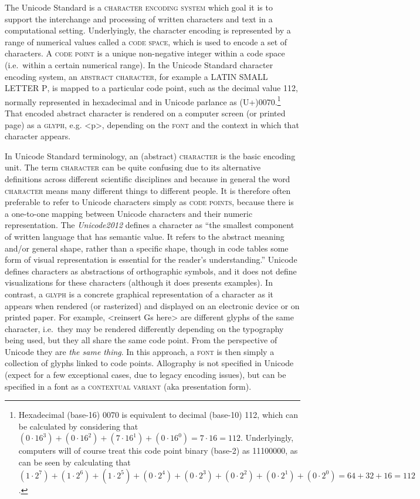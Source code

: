 The Unicode Standard is a \textsc{character encoding system} which goal it is to support the interchange and processing of written characters and text in a computational setting. Underlyingly, the character encoding is represented by a range of numerical values called a \textsc{code space}, which is used to encode a set of characters. A \textsc{code point} is a unique non-negative integer within a code space (i.e.~within a certain numerical range). In the Unicode Standard character encoding system, an \textsc{abstract character}, for example a \textsc{LATIN SMALL LETTER P}, is mapped to a particular code point, such as the decimal value 112, normally represented in hexadecimal and in Unicode parlance as (U+)0070.\footnote{Hexadecimal (base-16) 0070 is equivalent to decimal (base-10) 112, which can be calculated by considering that $(0\cdot16^3) + (0\cdot16^2) + (7\cdot16^1) + (0\cdot16^0) = 7\cdot16 = 112$. Underlyingly, computers will of course treat this code point binary (base-2) as 11100000, as can be seen by calculating that $(1\cdot2^7) + (1\cdot2^6) + (1\cdot2^5) + (0\cdot2^4) + (0\cdot2^3) + (0\cdot2^2) + (0\cdot2^1) + (0\cdot2^0) = 64 + 32 + 16 = 112$.} That encoded abstract character is rendered on a computer screen (or printed page) as a \textsc{glyph}, e.g. <p>, depending on the \textsc{font} and the context in which that character appears.

In Unicode Standard terminology, an (abstract) \textsc{character} is the basic encoding unit. The term \textsc{character} can be quite confusing due to its alternative definitions across different scientific disciplines and because in general the word \textsc{character} means many different things to different people. It is therefore often preferable to refer to Unicode characters simply as \textsc{code points}, because there is a one-to-one mapping between Unicode characters and their numeric representation. The \textit{Unicode2012} defines a character as ``the smallest component of written language that has semantic value. It refers to the abstract meaning and/or general shape, rather than a specific shape, though in code tables some form of visual representation is essential for the reader's understanding.'' Unicode defines characters as abstractions of orthographic symbols, and it does not define visualizations for these characters (although it does presents examples). In contrast, a \textsc{glyph} is a concrete graphical representation of a character as it appears when rendered (or rasterized) and displayed on an electronic device or on printed paper. For example, <reinsert Gs here> are different glyphs of the same character, i.e.~they may be rendered differently depending on the typography being used, but they all share the same code point. From the perspective of Unicode they are \textit{the same thing}. In this approach, a \textsc{font} is then simply a collection of glyphs linked to code points. Allography is not specified in Unicode (expect for a few exceptional cases, due to legacy encoding issues), but can be specified in a font as a \textsc{contextual variant} (aka presentation form).

